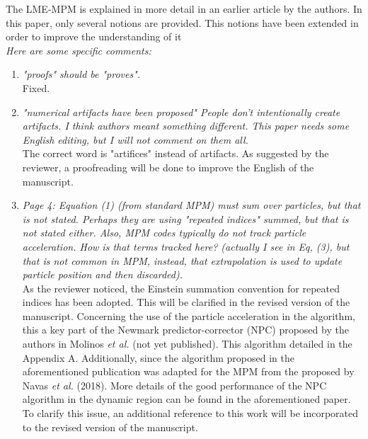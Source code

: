 \documentclass[12pt]{article}
\begin{document}
The LME-MPM is explained in more detail in an earlier article by the authors. In this paper, only several notions are provided. This notions have been extended in order to improve the understanding of it
\\

\textit{Here are some specific comments:}

 \begin{enumerate}
 
 \item \textit{"proofs" should be "proves".}\\
 
 Fixed.

 \item \textit{"numerical artifacts have been proposed" People don't intentionally create artifacts. I think authors meant something different. This paper needs some English editing, but I will not comment on them all.}\\
 
The correct word is "artifices" instead of artifacts. As suggested by the reviewer, a proofreading will be done to improve the English of the manuscript.
 
 \item \textit{Page 4: Equation (1) (from standard MPM) must sum over particles, but that is not stated. Perhaps they are using "repeated indices" summed, but that is not stated either. Also, MPM codes typically do not track particle acceleration. How is that terms tracked here? (actually I see in Eq, (3), but that is not common in MPM, instead, that extrapolation is used to update particle position and then discarded).}\\
 
As the reviewer noticed, the Einstein summation convention for repeated indices has been adopted. This will be clarified in the revised version of the manuscript. Concerning the use of the particle acceleration in the algorithm, this a key part of the Newmark predictor-corrector (NPC) proposed by the authors in Molinos {\it et al.}  \cite{Molinos_2020} (not yet published). This algorithm detailed in the Appendix A. Additionally,  since the algorithm proposed in the aforementioned publication was adapted for the MPM from the proposed by Navas {\it et al.} \cite{Navas_2018a} (2018). More details of the good performance of the NPC algorithm in the dynamic region can be found in the aforementioned paper. To clarify this issue, an additional reference to this work will be incorporated to the revised version of the manuscript.


\end{enumerate}
\end{document}
